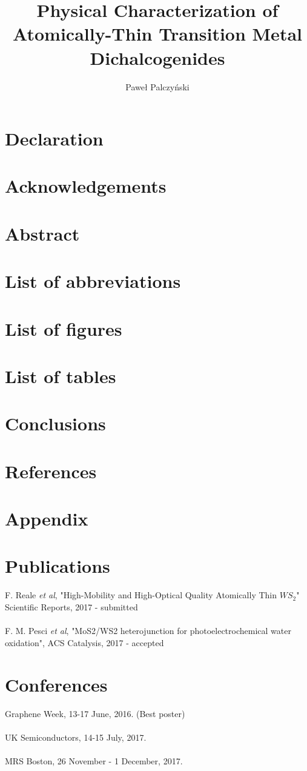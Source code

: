 \documentclass[12pt, a4paper]{report}
\author{Paweł Palczyński}
\begin{document}
\tableofcontents

\title{Physical Characterization of Atomically-Thin Transition Metal Dichalcogenides}

\maketitle

\section*{Declaration}
\section*{Acknowledgements}
\section*{Abstract}
\section*{List of abbreviations}
\section*{List of figures}
\section*{List of tables}


	\label{sec:Introduction}





\section{Conclusions}
	
\section*{References}
\section*{Appendix}

\section*{Publications}

F. Reale \textit{et al}, "High-Mobility and High-Optical Quality Atomically Thin $WS_2$" Scientific Reports, 2017 - submitted\\ \\
F. M. Pesci \textit{et al}, "MoS2/WS2 heterojunction for photoelectrochemical water oxidation", ACS Catalysis, 2017 - accepted

\section*{Conferences}

Graphene Week, 13-17 June, 2016. (Best poster)\\ \\
UK Semiconductors, 14-15 July, 2017.\\ \\
MRS Boston, 26 November - 1 December, 2017.


{}
\end{document}
